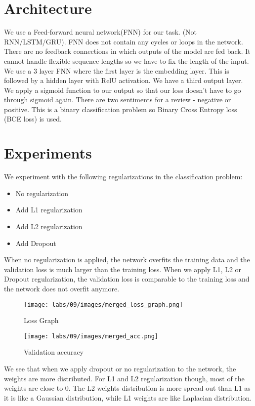 \section{Architecture}
We use a Feed-forward neural network(FNN) for our task. (Not RNN/LSTM/GRU). FNN does not contain any cycles or loops in the network. There are no feedback connections in which outputs of the model are fed back. It cannot handle flexible sequence lengths so we have to fix the length of the input. We use a 3 layer FNN where the first layer is the embedding layer. This is followed by a hidden layer with RelU activation. We have a third output layer. We apply a sigmoid function to our output so that our loss doesn't have to go through sigmoid again.
There are two sentiments for a review - negative or positive. This is a binary classification problem so Binary Cross Entropy loss (BCE loss) is used.

\section{Experiments}
We experiment with the following regularizations in the classification problem:
\begin{itemize}
    \item No regularization
    \item Add L1 regularization
    \item Add L2 regularization
    \item Add Dropout
\end{itemize}
When no regularization is applied, the network overfits the training data and the validation loss is much larger than the training loss. When we apply L1, L2 or Dropout regularization, the validation loss is comparable to the training loss and the network does not overfit anymore.

\begin{figure}
    \centering
    \texttt{[image: labs/09/images/merged\_loss\_graph.png]}
        \caption{Loss Graph}
        \label{fig:Loss Graph}
\end{figure}

\begin{figure}
    \centering
    \texttt{[image: labs/09/images/merged\_acc.png]}
        \caption{Validation accuracy}
        \label{fig:Validation accuracy}
\end{figure}

We see that when we apply dropout or no regularization to the network, the weights are more distributed. For L1 and L2 regularization though, most of the weights are close to 0. The L2 weights distribution is more spread out than L1 as it is like a Gaussian distribution, while L1 weights are like Laplacian distribution.


